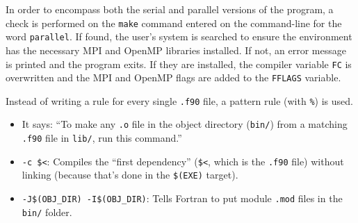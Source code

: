 \documentclass[
]{article}
\newenvironment{Shaded}{}{}
\newcommand{\CharTok}[1]{\textcolor[rgb]{0.25,0.44,0.63}{#1}}
\newcommand{\CommentTok}[1]{\textcolor[rgb]{0.38,0.63,0.69}{\textit{#1}}}
\newcommand{\ControlFlowTok}[1]{\textcolor[rgb]{0.00,0.44,0.13}{\textbf{#1}}}
\newcommand{\DataTypeTok}[1]{\textcolor[rgb]{0.56,0.13,0.00}{#1}}
\newcommand{\DecValTok}[1]{\textcolor[rgb]{0.25,0.63,0.44}{#1}}
\newcommand{\ErrorTok}[1]{\textcolor[rgb]{1.00,0.00,0.00}{\textbf{#1}}}
\newcommand{\FunctionTok}[1]{\textcolor[rgb]{0.02,0.16,0.49}{#1}}
\newcommand{\KeywordTok}[1]{\textcolor[rgb]{0.00,0.44,0.13}{\textbf{#1}}}
\newcommand{\NormalTok}[1]{#1}
\newcommand{\StringTok}[1]{\textcolor[rgb]{0.25,0.44,0.63}{#1}}
\providecommand{\tightlist}{%
  \setlength{\itemsep}{0pt}\setlength{\parskip}{0pt}}
\begin{document}
In order to encompass both the serial and parallel versions of the
program, a check is performed on the \texttt{make} command entered on
the command-line for the word \texttt{parallel}. If found, the user's
system is searched to ensure the environment has the necessary MPI and
OpenMP libraries installed. If not, an error message is printed and the
program exits. If they are installed, the compiler variable \texttt{FC}
is overwritten and the MPI and OpenMP flags are added to the
\texttt{FFLAGS} variable.

\begin{Shaded}
\end{Shaded}

Instead of writing a rule for every single \texttt{.f90} file, a pattern
rule (with \texttt{\%}) is used.

\begin{Shaded}
\end{Shaded}

\begin{itemize}
\tightlist
\item
  It says: ``To make any \texttt{.o} file in the object directory
  (\texttt{bin/}) from a matching \texttt{.f90} file in \texttt{lib/},
  run this command.''
\item
  \texttt{-c\ \$\textless{}}: Compiles the ``first dependency''
  (\texttt{\$\textless{}}, which is the \texttt{.f90} file) without
  linking (because that's done in the \texttt{\$(EXE)} target).
\item
  \texttt{-J\$(OBJ\_DIR)\ -I\$(OBJ\_DIR)}: Tells Fortran to put module
  \texttt{.mod} files in the \texttt{bin/} folder.
\end{itemize}
\end{document}

